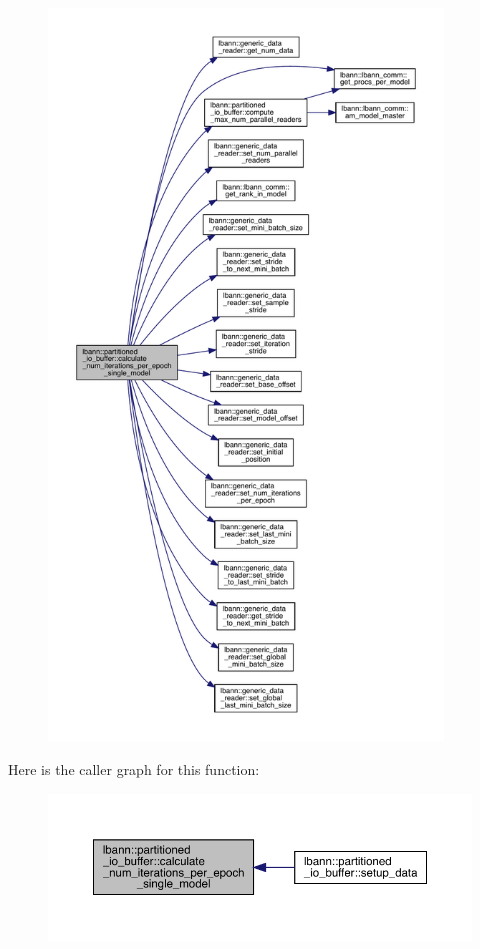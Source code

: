 \begin{figure}[H]
\begin{center}
\leavevmode
\includegraphics[height=550pt]{classlbann_1_1partitioned__io__buffer_ad707e54827d6e537127341b10407b716_cgraph}
\end{center}
\end{figure}
Here is the caller graph for this function\+:\nopagebreak
\begin{figure}[H]
\begin{center}
\leavevmode
\includegraphics[width=350pt]{classlbann_1_1partitioned__io__buffer_ad707e54827d6e537127341b10407b716_icgraph}
\end{center}
\end{figure}
